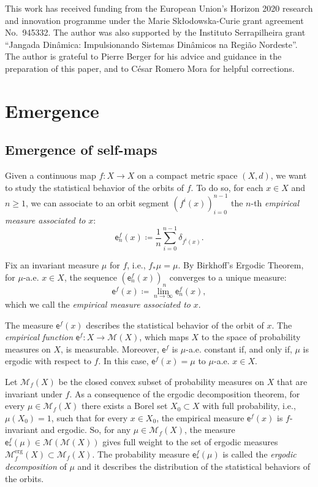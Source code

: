 \documentclass[11pt,reqno]{amsart}
\theoremstyle{plain}
\theoremstyle{definition}
\theoremstyle{remark}
\theoremstyle{plain}
\numberwithin{equation}{section}
\begin{document}
This work has received funding from the European Union's Horizon 2020 research
and innovation programme under the Marie Sk{\l}odowska-Curie grant agreement
No.~945332. The author was also supported by the Instituto Serrapilheira grant
``Jangada Dinâmica: Impulsionando Sistemas Dinâmicos na Região Nordeste''. The
author is grateful to Pierre Berger for his advice and guidance in the
preparation of this paper, and to C\'esar Romero Mora for helpful corrections.


\section{Emergence}\label{section: emergence}


\subsection{Emergence of self-maps} 
Given a continuous map $f\colon X\to X$ on a compact metric space $(X,d)$, we want to study the statistical behavior of the orbits of $f$. To do so, for each $x\in X$ and $n\ge 1$, we can associate to an orbit segment $(f^{i}(x))_{i=0}^{n-1}$ the $n$-th \textit{empirical measure associated to} $x$: $$\mathsf{e}_{n}^{f}(x)\coloneqq \frac{1}{n}\sum_{i=0}^{n-1}\delta_{f^{i}(x)}.$$

Fix an invariant measure $\mu$ for $f$, i.e., $f_{\ast}\mu=\mu$. By Birkhoff's Ergodic Theorem, for $\mu$-a.e. $x\in X$, the sequence $(\mathsf{e}_{n}^{f}(x))_{n}$ converges to a unique measure: $$\mathsf{e}^{f}(x)\coloneqq \lim_{n\to \infty} \mathsf{e}_{n}^{f}(x),$$ which we call the \textit{empirical measure associated to} $x$. 

The measure $\mathsf{e}^{f}(x)$ describes the statistical behavior of the orbit of $x$. The \textit{empirical function} $\mathsf{e}^{f}\colon X \to \mathcal{M}(X)$, which maps $X$ to the space of probability measures on $X$, is measurable. Moreover, $\mathsf{e}^{f}$ is $\mu$-a.e. constant if, and only if, $\mu$ is ergodic with respect to $f$. In this case, $\mathsf{e}^{f}(x)=\mu$ to $\mu$-a.e. $x\in X$. 

Let $\mathcal{M}_{f}(X)$ be the closed convex subset of probability measures on $X$ that are invariant under $f$. As a consequence of the ergodic decomposition theorem, for every $\mu\in \mathcal{M}_{f}(X)$ there exists a Borel set $X_{0}\subset X$ with full probability, i.e., $\mu(X_{0})=1$, such that for every $x\in X_{0}$, the empirical measure $\mathsf{e}^{f}(x)$ is $f$-invariant and ergodic. So, for any $\mu\in \mathcal{M}_{f}(X)$, the measure $\mathsf{e}^{f}_{\ast}(\mu)\in \mathcal{M}(\mathcal{M}(X))$ gives full weight to the set of ergodic measures $\mathcal{M}_{f}^{\mathrm{erg}}(X)\subset \mathcal{M}_{f}(X)$. The probability measure $\mathsf{e}^{f}_{\ast}(\mu)$ is called the \textit{ergodic decomposition} of $\mu$ and it describes the distribution of the statistical behaviors of the orbits.
\end{document}
